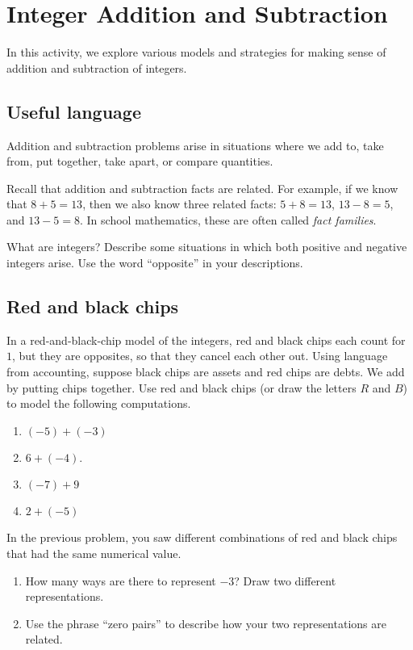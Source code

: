 \newpage
\section{Integer Addition and Subtraction}\label{A:integerAddition}

In this activity, we explore various models and strategies for 
making sense of addition and subtraction of integers.  

\subsection*{Useful language}
Addition and subtraction problems arise in situations where we add to, take from, put together, 
take apart, or compare quantities.  

Recall that addition and subtraction facts are related.  For example, if we know that $8+5 = 13$, 
then we also know three related facts:  $5+8=13$, $13-8=5$, and $13-5=8$.  In school mathematics, 
these are often called \emph{fact families}.  

\begin{prob}
What are integers?  Describe some situations in which both positive and negative integers arise.  Use the word ``opposite'' in your descriptions.  
\end{prob}

\subsection*{Red and black chips}
\begin{prob}
In a red-and-black-chip model of the integers, red and black chips each count for $1$, but they are opposites, so that they cancel each other out.  Using language from accounting, suppose black chips are assets and red chips are debts.  We add by putting chips together.  Use red and black chips (or draw the letters $R$ and $B$) to model the following computations.
\begin{enumerate}
\item $(-5)+(-3)$
\item $6+(-4)$.
\item $(-7)+9$
\item $2+(-5)$
\end{enumerate}
\end{prob}

\begin{prob}
In the previous problem, you saw different combinations of red and black chips that had the same numerical value.  
\begin{enumerate}
\item How many ways are there to represent $-3$?  Draw two different representations. 
\item Use the phrase ``zero pairs'' to describe how your two representations are related.  
\end{enumerate}
\end{prob}

